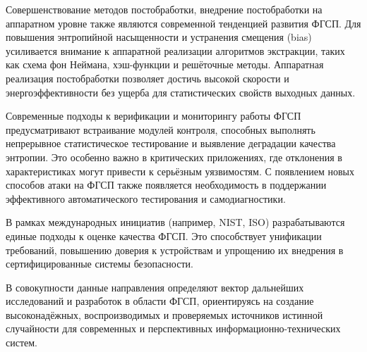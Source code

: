 Совершенствование методов постобработки, внедрение постобработки на
аппаратном уровне также являются современной тенденцией развития ФГСП.
Для повышения энтропийной насыщенности и устранения смещения (bias)
усиливается внимание к аппаратной реализации алгоритмов экстракции,
таких как схема фон Неймана, хэш-функции и решёточные методы. Аппаратная
реализация постобработки позволяет достичь высокой скорости и
энергоэффективности без ущерба для статистических свойств выходных
данных.

Современные подходы к верификации и мониторингу работы ФГСП
предусматривают встраивание модулей контроля, способных выполнять
непрерывное статистическое тестирование и выявление деградации качества
энтропии. Это особенно важно в критических приложениях, где отклонения в
характеристиках могут привести к серьёзным уязвимостям. С появлением
новых способов атаки на ФГСП также появляется необходимость в
поддержании эффективного автоматического тестирования и самодиагностики.

В рамках международных инициатив (например, NIST, ISO) разрабатываются
единые подходы к оценке качества ФГСП. Это способствует унификации
требований, повышению доверия к устройствам и упрощению их внедрения в
сертифицированные системы безопасности.

В совокупности данные направления определяют вектор дальнейших
исследований и разработок в области ФГСП, ориентируясь на создание
высоконадёжных, воспроизводимых и проверяемых источников истинной
случайности для современных и перспективных информационно-технических
систем.
